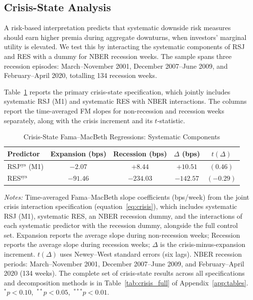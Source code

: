 \documentclass[11pt,a4paper]{article}
\begin{document}
\FloatBarrier

\subsection{Crisis-State Analysis}
\label{sec:crisis}

A risk-based interpretation predicts that systematic downside risk measures should earn
higher premia during aggregate downturns, when investors' marginal utility is elevated.
We test this by interacting the systematic components of RSJ and RES with a dummy for
NBER recession weeks. The sample spans three recession episodes: March--November 2001,
December 2007--June 2009, and February--April 2020, totalling 134 recession weeks.

Table~\ref{tab:crisis_state} reports the primary crisis-state specification, which
jointly includes systematic RSJ (M1) and systematic RES with NBER interactions. The
columns report the time-averaged FM slopes for non-recession and recession weeks
separately, along with the crisis increment and its $t$-statistic.

\begin{table}[!htbp]
\centering
\caption{Crisis-State Fama--MacBeth Regressions: Systematic Components}
\label{tab:crisis_state}
\small
\begin{threeparttable}
\begin{tabular}{l c c c c}
\toprule
Predictor
  & Expansion (bps) & Recession (bps)
  & $\Delta$ (bps) & $t(\Delta)$ \\
\midrule
RSJ$^{\text{sys}}$ (M1) & $-2.07$ & $+8.44$  & $+10.51$ & $(0.46)$ \\[3pt]
RES$^{\text{sys}}$      & $-91.46$ & $-234.03$ & $-142.57$ & $(-0.29)$ \\
\bottomrule
\end{tabular}
\begin{tablenotes}
\footnotesize
\item \textit{Notes:} Time-averaged Fama--MacBeth slope coefficients (bps/week) from
the joint crisis interaction specification (equation~\eqref{eq:crisis}), which includes
systematic RSJ (M1), systematic RES, an NBER recession dummy, and the interactions of
each systematic predictor with the recession dummy, alongside the full control set.
Expansion reports the average slope during non-recession weeks; Recession reports the
average slope during recession weeks; $\Delta$ is the crisis-minus-expansion increment.
$t(\Delta)$ uses Newey--West standard errors (six lags). NBER recession periods:
March--November 2001, December 2007--June 2009, and February--April 2020 (134 weeks).
The complete set of crisis-state results across all specifications and decomposition
methods is in Table~\ref{tab:crisis_full} of Appendix~\ref{app:tables}. \\
$^{*}p<0.10$,\ $^{**}p<0.05$,\ $^{***}p<0.01$.
\end{tablenotes}
\end{threeparttable}
\end{table}
\end{document}
